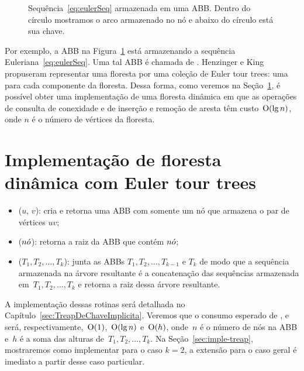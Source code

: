 \begin{figure}[htb]
\centering
\caption{Sequência~\eqref{eq:eulerSeq}  armazenada em uma ABB. Dentro do círculo mostramos o arco armazenado no nó e abaixo do círculo está sua chave.}
\label{fig:seq-treap-indices}
\end{figure}

Por exemplo, a ABB na Figura~\ref{fig:seq-treap-indices} está armazenando a sequência Euleriana~\eqref{eq:eulerSeq}.
Uma tal ABB é chamada de . 
Henzinger e King propuseram representar uma floresta por uma coleção de Euler tour trees: uma para cada componente da floresta. 
Dessa forma, como veremos na Seção~\ref{sec:impleDF-ETT}, é possível obter uma implementação de uma floresta dinâmica em que as operações de consulta de conexidade e de inserção e remoção de aresta têm custo~$\mathrm{O}(\lg n)$, onde $n$ é o número de vértices da floresta.


\section{Implementação de floresta dinâmica com Euler tour trees}
\label{sec:impleDF-ETT}


\begin{itemize}
\item  \treapCreate($u$, $v$): cria e retorna uma ABB com somente um nó que armazena o par de vértices $uv$;
\item \treapGetRoot($n\acute{o}$): retorna a raiz da ABB que contém $n\acute{o}$;
\item \treapJoin($T_1, T_2, \ldots, T_k$): junta as ABBs $T_1, T_2, \ldots, T_{k-1}$ e $T_k$ de modo que a sequência armazenada na árvore resultante é a concatenação das sequências armazenada em~$T_1, T_2, \ldots, T_k$ e retorna a raiz dessa árvore resultante.
\end{itemize}

A implementação dessas rotinas será detalhada no Capítulo~\ref{sec:TreapDeChaveImplicita}. Veremos que o consumo esperado de \treapCreate, \treapGetRoot{} e \treapJoin{} será, respectivamente,~$\mathrm{O}(1)$,~$\mathrm{O}(\lg n)$ e~$\mathrm{O}(h)$, onde~$n$ é o número de nós na ABB e~$h$ é a soma das alturas de~$T_1, T_2, \ldots, T_k$. Na Seção~\ref{sec:imple-treap}, mostraremos como implementar \treapJoin{} para o caso $k=2$, a extensão para o caso geral é imediato a partir desse caso particular.

